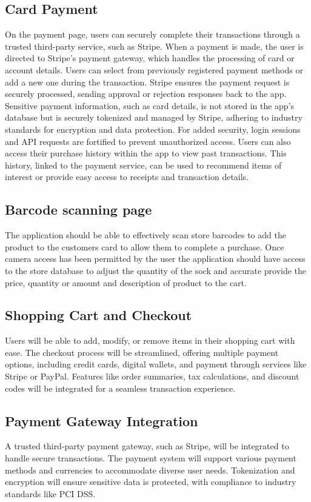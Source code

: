 \documentclass[conference]{IEEEtran}
\begin{document}
 \subsection{Card Payment}
On the payment page, users can securely complete their transactions through a trusted third-party service, such as Stripe. When a payment is made, the user is directed to Stripe’s payment gateway, which handles the processing of card or account details. Users can select from previously registered payment methods or add a new one during the transaction. Stripe ensures the payment request is securely processed, sending approval or rejection responses back to the app.
Sensitive payment information, such as card details, is not stored in the app’s database but is securely tokenized and managed by Stripe, adhering to industry standards for encryption and data protection. For added security, login sessions and API requests are fortified to prevent unauthorized access. Users can also access their purchase history within the app to view past transactions. This history, linked to the payment service, can be used to recommend items of interest or provide easy access to receipts and transaction details.

\subsection{Barcode scanning page}
The application should be able to effectively scan store barcodes to add the product to the customers card to allow them to complete a purchase. Once camera access has been permitted by the user the application should have access to the store database to adjust the quantity of the sock and accurate provide the price, quantity or amount and description of product to the cart.

\subsection{Shopping Cart and Checkout}
Users will be able to add, modify, or remove items in their shopping cart with ease. The checkout process will be streamlined, offering multiple payment options, including credit cards, digital wallets, and payment through services like Stripe or PayPal. Features like order summaries, tax calculations, and discount codes will be integrated for a seamless transaction experience.

\subsection{Payment Gateway Integration}
A trusted third-party payment gateway, such as Stripe, will be integrated to handle secure transactions. The payment system will support various payment methods and currencies to accommodate diverse user needs. Tokenization and encryption will ensure sensitive data is protected, with compliance to industry standards like PCI DSS.
\end{document}
